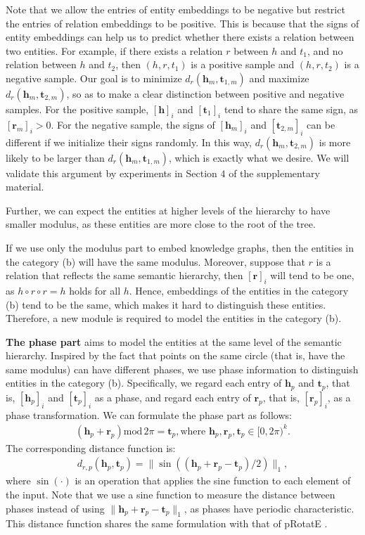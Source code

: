 \documentclass[letterpaper]{article} \usepackage{aaai20}  \usepackage{times}  \usepackage{helvet} \usepackage{courier}  \usepackage[hyphens]{url}  \usepackage{graphicx} \urlstyle{rm} \def\UrlFont{\rm}  \usepackage{graphicx}  \frenchspacing  \setlength{\pdfpagewidth}{8.5in}  \setlength{\pdfpageheight}{11in}
\newcommand{\citep}{\cite}
\begin{document}
Note that we allow the entries of entity embeddings to be negative but restrict the entries of relation embeddings to be positive. This is because that the signs of entity embeddings can help us to predict whether there exists a relation between two entities. For example, if there exists a relation $r$ between $h$ and $t_1$, and no relation between $h$ and $t_2$, then $(h, r, t_1)$ is a positive sample and $(h, r, t_2)$ is a negative sample. Our goal is to minimize $d_r(\textbf{h}_m, \textbf{t}_{1,m})$ and maximize $d_r(\textbf{h}_m, \textbf{t}_{2,m})$, so as to make a clear distinction between positive and negative samples. For the positive sample, $[\textbf{h}]_i$ and $[\textbf{t}_1]_i$ tend to share the same sign, as $[\textbf{r}_m]_i>0$. For the negative sample, the signs of $[\textbf{h}_m]_i$ and $[\textbf{t}_{2,m}]_i$ can be different if we initialize their signs randomly. In this way, $d_r(\textbf{h}_m, \textbf{t}_{2,m})$ is more likely to be larger than $d_r(\textbf{h}_m, \textbf{t}_{1,m})$, which is exactly what we desire. We will validate this argument by experiments in Section $4$ of the supplementary material.

Further, we can expect the entities at higher levels of the hierarchy to have smaller modulus, as these entities are more close to the root of the tree.

If we use only the modulus part to embed knowledge graphs, then the entities in the category (b) will have the same modulus. Moreover, suppose that $r$ is a relation that reflects the same semantic hierarchy, then $[\textbf{r}]_i$ will tend to be one, as $h\circ r\circ r=h$ holds for all $h$. Hence, embeddings of the entities in the category (b) tend to be the same, which makes it hard to distinguish these entities. Therefore, a new module is required to model the entities in the category (b). 

\textbf{The phase part} aims to model the entities at the same level of the semantic hierarchy. Inspired by the fact that points on the same circle (that is, have the same modulus) can have different phases, we use phase information to distinguish entities in the category (b). Specifically, we regard each entry of $\textbf{h}_p$ and $\textbf{t}_p$, that is, $[\textbf{h}_p]_i$ and $[\textbf{t}_p]_i$ as a phase, and regard each entry of $\textbf{r}_p$, that is, $[\textbf{r}_p]_i$, as a phase transformation. We can formulate the phase part as follows:
\begin{align*}
    (\textbf{h}_p+\textbf{r}_p)\text{mod}\, 2\pi=\textbf{t}_p, \text{where } \textbf{h}_p,\textbf{r}_p,\textbf{t}_p\in[0,2\pi)^k.
\end{align*}
The corresponding distance function is:
\begin{align*}
    d_{r,p}(\textbf{h}_p,\textbf{t}_p)=\|\sin((\textbf{h}_p+\textbf{r}_p-\textbf{t}_p)/2)\|_1,
\end{align*}
where $\sin(\cdot)$ is an operation that applies the sine function to each element of the input. Note that we use a sine function to measure the distance between phases instead of using $\|\textbf{h}_p+\textbf{r}_p-\textbf{t}_p\|_1$, as phases have periodic characteristic. This distance function shares the same formulation with that of pRotatE \citep{rotate}.
\end{document}
